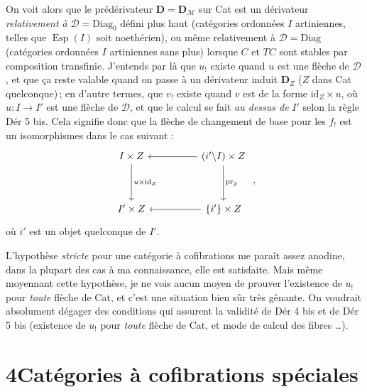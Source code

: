 \documentclass[11pt]{article}
\newcommand{\printedpage}[1]{\marginpar{\footnotesize p.~#1}}
\newcommand{\msp}[1]{\marginpar{\footnotesize [#1]}}
\newcommand{\Esp}{\operatorname{Esp}}
\newcommand{\id}{\mathrm{id}}
\newcommand{\pr}{\mathrm{pr}}
\newcommand{\M}{\mathcal{M}}
\begin{document}
On voit alors que le prédérivateur $\mathbf{D} = \mathbf{D}_{\M}$ sur Cat est un dérivateur \textit{relativement à} $\mathcal{D} = \mathrm{Diag}_0$ défini plus haut (catégories ordonnées $I$ artiniennes, telles que $\Esp(I)$ soit noethérien), ou même relativement à $\mathcal{D} = \mathrm{Diag}$ (catégories ordonnées $I$ artiniennes sans plus) lorsque $C$ et $TC$ sont stables par composition transfinie. J'entends par là que $u_!$ existe quand $u$ est une flèche de $\mathcal{D}$,
\msp{page 70}
et que ça reste valable quand on passe à un dérivateur induit $\mathbf{D}_Z$ ($Z$ dans Cat quelconque)\,; en d'autre termes, que $v_!$ existe quand $v$ est de la forme $\id_Z\times u$, où $u : I\longrightarrow I'$ est une %
flèche de $\mathcal{D}$, et que le calcul se fait \textit{au dessus de} $I'$ selon la règle Dér 5 bis. Cela signifie donc que la flèche de changement de base pour les $f_!$ est un isomorphismes dans le cas %
suivant :
\[
\begin{tikzcd}[row sep=huge, column sep=huge]
I\times Z \arrow[d, "u\times\id_Z"] & (i'\backslash I)\times Z \arrow[l] \arrow[d, "\pr_2"] \\
I'\times Z & \{i'\}\times Z \arrow[l]
\end{tikzcd}
\ ,
\]
où $i'$ est un objet quelconque de $I'$.

\printedpage{34}
L'hypothèse \textit{stricte} pour une catégorie à cofibrations me paraît assez anodine, dans la plupart des cas à ma connaissance, elle est satisfaite. Mais même moyennant cette hypothèse, je ne vois aucun moyen de prouver l'existence de $u_!$ pour \textit{toute} flèche de Cat, et c'est une situation bien sûr très gênante. On voudrait absolument dégager des conditions qui assurent la validité de Dér 4 bis et de Dér 5 bis (existence de $u_!$ pour
\msp{page 71}
\textit{toute} flèche de Cat, et mode de calcul des fibres \dots).

\section*{4\quad Catégories à cofibrations spéciales}
\end{document}
